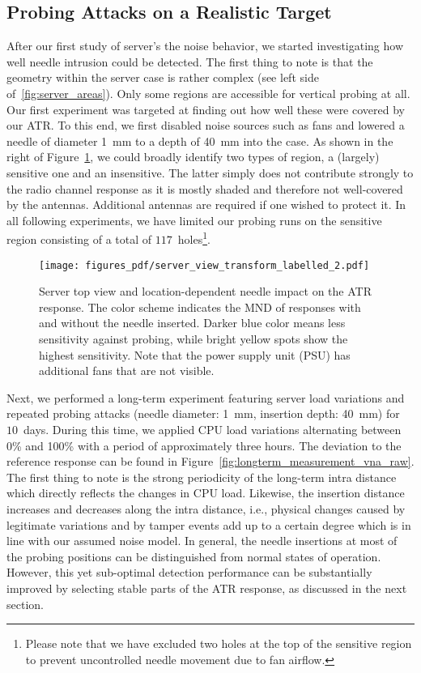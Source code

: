\documentclass[conference]{IEEEtran}
\begin{document}
\subsection{Probing Attacks on a Realistic Target}
After our first study of server's the noise behavior, we started investigating how well needle intrusion could be detected. The first thing to note is that the geometry within the server case is rather complex (see left side of~\autoref{fig:server_areas}). Only some regions are accessible for vertical probing at all. Our first experiment was targeted at finding out how well these were covered by our ATR. To this end, we first disabled noise sources such as fans and lowered a needle of diameter \SI{1}{\mm} to a depth of \SI{40}{\mm} into the case. As shown in the right of Figure~\ref{fig:server_areas}, we could broadly identify two types of region, a (largely) sensitive one and an insensitive. The latter simply does not contribute strongly to the radio channel response as it is mostly shaded and therefore not well-covered by the antennas. Additional antennas are required if one wished to protect it. In all following experiments, we have limited our probing runs on the sensitive region consisting of a total of $117$~holes\footnote{Please note that we have excluded two holes at the top of the sensitive region to prevent uncontrolled needle movement due to fan airflow.}.

\begin{figure}
\centering
\texttt{[image: figures\_pdf/server\_view\_transform\_labelled\_2.pdf]}\caption{Server top view and location-dependent needle impact on the ATR response. The color scheme indicates the MND of responses with and without the needle inserted. Darker blue color means less sensitivity against probing, while bright yellow spots show the highest sensitivity. Note that the power supply unit (PSU) has additional fans that are not visible.}
\label{fig:server_areas}
\end{figure}

Next, we performed a long-term experiment featuring server load variations and repeated probing attacks (needle diameter: \SI{1}{\mm}, insertion depth: \SI{40}{\mm}) for $10$~days. During this time, we applied CPU load variations alternating between 0\% and 100\% with a period of approximately three hours. The deviation to the reference response can be found in Figure~\ref{fig:longterm_measurement_vna_raw}. The first thing to note is the strong periodicity of the long-term intra distance which directly reflects the changes in CPU load. Likewise, the insertion distance increases and decreases along the intra distance, i.e., physical changes caused by legitimate variations and by tamper events add up to a certain degree which is in line with our assumed noise model. In general, the needle insertions at most of the probing positions can be distinguished from normal states of operation. However, this yet sub-optimal detection performance can be substantially improved by selecting stable parts of the ATR response, as discussed in the next section.
\end{document}
